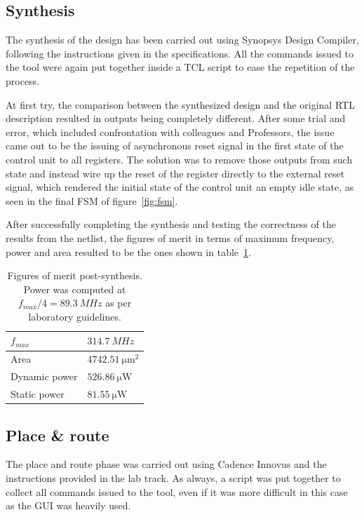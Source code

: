 \documentclass[a4paper]{article}
\begin{document}
\subsection{Synthesis}
The synthesis of the design has been carried out using Synopsys Design Compiler, following the instructions given in the specifications. All the commands issued to the tool were again put together inside a TCL script to ease the repetition of the process. 

At first try, the comparison between the synthesized design and the original RTL description resulted in outputs being completely different. After some trial and error, which included confrontation with colleagues and Professors, the issue came out to be the issuing of asynchronous reset signal in the first state of the control unit to all registers. The solution was to remove those outputs from such state and instead wire up the reset of the register directly to the external reset signal, which rendered the initial state of the control unit an empty idle state, as seen in the final FSM of figure~\ref{fig:fsm}.

After successfully completing the synthesis and testing the correctness of the results from the netlist, the figures of merit in terms of maximum frequency, power and area resulted to be the ones shown in table~\ref{tab:base_post_syn}.

\begin{table}[hbtp]
    \centering
    \begin{tabular}{|l|l|}
    \hline
    $f_{max}$     & $\SI{314.7}{MHz}$              \\ \hline
    Area          & $\SI{4742.51}{\micro\meter^2}$ \\ \hline
    Dynamic power & $\SI{526.86}{\micro\watt}$     \\ \hline
    Static power  & $\SI{81.55}{\micro\watt}$      \\ \hline
    \end{tabular}
    \caption{Figures of merit post-synthesis. Power was computed at $f_{max}/4 = \SI{89.3}{MHz}$ as per laboratory guidelines.}
    \label{tab:base_post_syn}
\end{table}

\subsection{Place \& route}
The place and route phase was carried out using Cadence Innovus and the instructions provided in the lab track. As always, a script was put together to collect all commands issued to the tool, even if it was more difficult in this case as the GUI was heavily used. 
\end{document}
